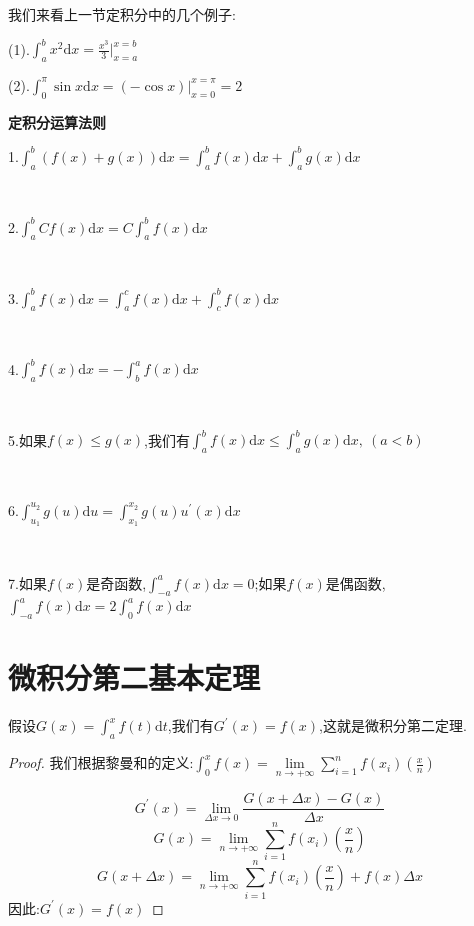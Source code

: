 \documentclass[oneside]{book}
\begin{document}
	我们来看上一节定积分中的几个例子:
	
	(1).$\int_{a}^{b}x^{2}\mathrm{d}x=\frac{x^{3}}{3}|_{x=a}^{x=b}$
	
	(2).$\int_{0}^{\pi}\sin x\mathrm{d}x=(-\cos x)|_{x=0}^{x=\pi}=2$
	
	\textbf{定积分运算法则}
	
	1.$\int_{a}^{b}(f(x)+g(x))\mathrm{d}x=\int_{a}^{b}f(x)\mathrm{d}x+\int_{a}^{b}g(x)\mathrm{d}x$
	
	\hspace{\fill}\
	
	2.$\int_{a}^{b}Cf(x)\mathrm{d}x=C\int_{a}^{b}f(x)\mathrm{d}x$
	
	\hspace{\fill}\
	
	3.$\int_{a}^{b}f(x)\mathrm{d}x=\int_{a}^{c}f(x)\mathrm{d}x+\int_{c}^{b}f(x)\mathrm{d}x$
	
	\hspace{\fill}\
	
	4.$\int_{a}^{b}f(x)\mathrm{d}x=-\int_{b}^{a}f(x)\mathrm{d}x$
	
	\hspace{\fill}\
	
	5.如果$f(x)\leq g(x)$,我们有$\int_{a}^{b}f(x)\mathrm{d}x\leq \int_{a}^{b}g(x)\mathrm{d}x,\ (a<b)$
	
	\hspace{\fill}\
	
	6.$\int_{u_{1}}^{u_{2}}g(u)\mathrm{d}u=\int_{x_{1}}^{x_{2}}g(u)u^{'}(x)\mathrm{d}x$
	
	\hspace{\fill}\
	
	7.如果$f(x)$是奇函数,$\int_{-a}^{a}f(x)\mathrm{d}x=0$;如果$f(x)$是偶函数,$\int_{-a}^{a}f(x)\mathrm{d}x=2\int_{0}^{a}f(x)\mathrm{d}x$
	\chapter{微积分第二基本定理}
	假设$G(x)=\int_{a}^{x}f(t)\mathrm{d}t$,我们有$G^{'}(x)=f(x)$,这就是微积分第二定理.
	\begin{proof}
		我们根据黎曼和的定义:$\int_{0}^{x} f(x)=\lim\limits_{n\rightarrow +\infty}\sum_{i=1}^{n}f(x_{i})(\frac{x}{n})$
		
		$$G^{'}(x)=\lim\limits_{\Delta x\rightarrow 0}\frac{G(x+\Delta x)-G(x)}{\Delta x}$$
		$$G(x)=\lim\limits_{n\rightarrow +\infty}\sum_{i=1}^{n}f(x_{i})(\frac{x}{n})$$
		$$G(x+\Delta x)=\lim\limits_{n\rightarrow +\infty}\sum_{i=1}^{n}f(x_{i})(\frac{x}{n})+f(x)\Delta x$$
		因此:$G^{'}(x)=f(x)$
	\end{proof}
\end{document}
